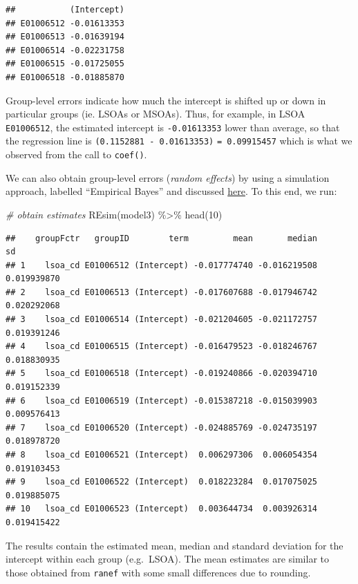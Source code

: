 \documentclass[
]{book}
\newenvironment{Shaded}{\begin{snugshade}}{\end{snugshade}}
\newcommand{\CommentTok}[1]{\textcolor[rgb]{0.56,0.35,0.01}{\textit{#1}}}
\newcommand{\DecValTok}[1]{\textcolor[rgb]{0.00,0.00,0.81}{#1}}
\newcommand{\FunctionTok}[1]{\textcolor[rgb]{0.00,0.00,0.00}{#1}}
\newcommand{\NormalTok}[1]{#1}
\newcommand{\SpecialCharTok}[1]{\textcolor[rgb]{0.00,0.00,0.00}{#1}}
\begin{document}
\begin{verbatim}
##           (Intercept)
## E01006512 -0.01613353
## E01006513 -0.01639194
## E01006514 -0.02231758
## E01006515 -0.01725055
## E01006518 -0.01885870
\end{verbatim}

Group-level errors indicate how much the intercept is shifted up or down in particular groups (ie. LSOAs or MSOAs). Thus, for example, in LSOA \texttt{E01006512}, the estimated intercept is \texttt{-0.01613353} lower than average, so that the regression line is \texttt{(0.1152881\ -\ 0.01613353)} \texttt{=\ 0.09915457} which is what we observed from the call to \texttt{coef()}.

We can also obtain group-level errors (\emph{random effects}) by using a simulation approach, labelled ``Empirical Bayes'' and discussed \href{https://stat.ethz.ch/pipermail/r-sig-mixed-models/2009q4/002984.html}{here}. To this end, we run:

\begin{Shaded}
\begin{Highlighting}[]
\CommentTok{\# obtain estimates}
\FunctionTok{REsim}\NormalTok{(model3) }\SpecialCharTok{\%\textgreater{}\%} \FunctionTok{head}\NormalTok{(}\DecValTok{10}\NormalTok{)}
\end{Highlighting}
\end{Shaded}

\begin{verbatim}
##    groupFctr   groupID        term         mean       median          sd
## 1    lsoa_cd E01006512 (Intercept) -0.017774740 -0.016219508 0.019939870
## 2    lsoa_cd E01006513 (Intercept) -0.017607688 -0.017946742 0.020292068
## 3    lsoa_cd E01006514 (Intercept) -0.021204605 -0.021172757 0.019391246
## 4    lsoa_cd E01006515 (Intercept) -0.016479523 -0.018246767 0.018830935
## 5    lsoa_cd E01006518 (Intercept) -0.019240866 -0.020394710 0.019152339
## 6    lsoa_cd E01006519 (Intercept) -0.015387218 -0.015039903 0.009576413
## 7    lsoa_cd E01006520 (Intercept) -0.024885769 -0.024735197 0.018978720
## 8    lsoa_cd E01006521 (Intercept)  0.006297306  0.006054354 0.019103453
## 9    lsoa_cd E01006522 (Intercept)  0.018223284  0.017075025 0.019885075
## 10   lsoa_cd E01006523 (Intercept)  0.003644734  0.003926314 0.019415422
\end{verbatim}

The results contain the estimated mean, median and standard deviation for the intercept within each group (e.g.~LSOA). The mean estimates are similar to those obtained from \texttt{ranef} with some small differences due to rounding.
\end{document}
